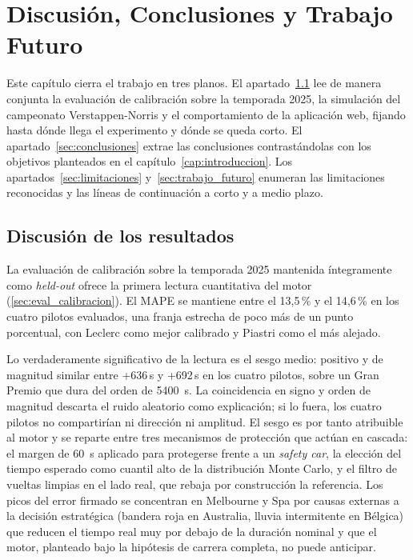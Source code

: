 
\chapter{Discusión, Conclusiones y Trabajo Futuro}
\label{cap:conclusiones}

Este capítulo cierra el trabajo en tres planos. El apartado~\ref{sec:discusion} lee de manera conjunta la evaluación de calibración sobre la temporada 2025, la simulación del campeonato Verstappen-Norris y el comportamiento de la aplicación web, fijando hasta dónde llega el experimento y dónde se queda corto. El apartado~\ref{sec:conclusiones} extrae las conclusiones contrastándolas con los objetivos planteados en el capítulo~\ref{cap:introduccion}. Los apartados~\ref{sec:limitaciones} y~\ref{sec:trabajo_futuro} enumeran las limitaciones reconocidas y las líneas de continuación a corto y a medio plazo.

\section{Discusión de los resultados}
\label{sec:discusion}

La evaluación de calibración sobre la temporada 2025 mantenida íntegramente como \textit{held-out} ofrece la primera lectura cuantitativa del motor (\ref{sec:eval_calibracion}). El MAPE se mantiene entre el 13{,}5\,\% y el 14{,}6\,\% en los cuatro pilotos evaluados, una franja estrecha de poco más de un punto porcentual, con Leclerc como mejor calibrado y Piastri como el más alejado. 

Lo verdaderamente significativo de la lectura es el sesgo medio: positivo y de magnitud similar entre +636\,s y +692\,s en los cuatro pilotos, sobre un Gran Premio que dura del orden de \SI{5400}{\second}. La coincidencia en signo y orden de magnitud descarta el ruido aleatorio como explicación; si lo fuera, los cuatro pilotos no compartirían ni dirección ni amplitud. El sesgo es por tanto atribuible al motor y se reparte entre tres mecanismos de protección que actúan en cascada: el margen de \SI{60}{\second} aplicado para protegerse frente a un \textit{safety car}, la elección del tiempo esperado como cuantil alto de la distribución Monte Carlo, y el filtro de vueltas limpias en el lado real, que rebaja por construcción la referencia. Los picos del error firmado se concentran en Melbourne y Spa por causas externas a la decisión estratégica (bandera roja en Australia, lluvia intermitente en Bélgica) que reducen el tiempo real muy por debajo de la duración nominal y que el motor, planteado bajo la hipótesis de carrera completa, no puede anticipar.

